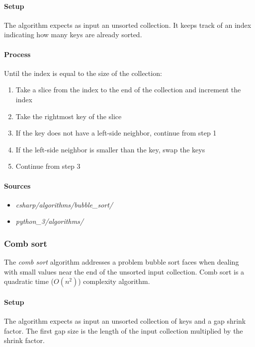 \documentclass{article}
\begin{document}
\paragraph{Setup}
The algorithm expects as input an unsorted collection. It keeps track of an index indicating how many keys are
already sorted.

\paragraph{Process}
Until the index is equal to the size of the collection:
\begin{enumerate}
\item{Take a slice from the index to the end of the collection and increment the index}
\item{Take the rightmost key of the slice}
\item{If the key does not have a left-side neighbor, continue from step 1}
\item{If the left-side neighbor is smaller than the key, swap the keys}
\item{Continue from step 3}
\end{enumerate}

\begin{samepage}
  \paragraph{Sources}
  \begin{itemize}
  \item{{\em csharp/algorithms/bubble\_sort/}}
  \item{{\em python\_3/algorithms/}}
  \end{itemize}
\end{samepage}


\subsubsection{Comb sort}
The {\em comb sort} algorithm addresses a problem bubble sort faces when dealing with small values near the end of
the unsorted input collection. Comb sort is a quadratic time (\(O(n^2)\)) complexity algorithm.

\paragraph{Setup}
The algorithm expects as input an unsorted collection of keys and a gap shrink factor. The first gap size is the
length of the input collection multiplied by the shrink factor.
\end{document}
